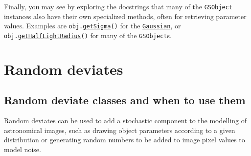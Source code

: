 \documentclass[preprint,11pt]{../../devel/modules/aastex}
\begin{document}
Finally, you may see by exploring the docstrings that many of the \texttt{GSObject}
instances also have their own specialized methods, often for
retrieving parameter values. Examples are
  \texttt{obj.}\href{http://galsim-developers.github.com/GalSim/classgalsim_1_1base_1_1_gaussian.html#a418f2826a7b8934cfedc181de23ce826}{\texttt{getSigma}}\texttt{()}
for the
\href{http://galsim-developers.github.com/GalSim/classgalsim_1_1base_1_1_gaussian.html}{\texttt{Gaussian}},
or
  \texttt{obj.}\href{http://galsim-developers.github.com/GalSim/classgalsim_1_1base_1_1_sersic.html#ad6ca39293c6b478fc052d07ea51d086f}{\texttt{getHalfLightRadius}}\texttt{()}
for many of the \texttt{GSObject}s.

\section{Random deviates}\label{sect:random}
\subsection{Random deviate classes and when to use them}
Random deviates can be used to add a stochastic
component to the modelling of astronomical images, such as drawing
object parameters according to a given distribution or generating random
numbers to be added to image pixel values to model noise. 
\end{document}
